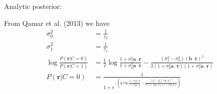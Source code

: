 \documentclass[12pt]{article}
\begin{document}
Analytic posterior:

From Qamar et al. (2013) we have
\begin{equation}
\begin{aligned}
\sigma_0^2 &= \frac{1}{\tau_0}\\
\sigma_1^2 &= \frac{1}{\tau_1}\\
\log \frac{P(\mathbf{r}|C = 0)}{P(\mathbf{r}|C = 1)} &= \frac{1}{2} \log \frac{1 + \sigma_1^2 \mathbf{a} \cdot \mathbf{r}}{1 + \sigma_0^2\mathbf{a} \cdot \mathbf{r}} - \frac{(\sigma_1^2 - \sigma_0^2)(\mathbf{b} \cdot \mathbf{r})^2}{2 (1 + \sigma_0^2 \mathbf{a} \cdot \mathbf{r})(1 + \sigma_1^2 \mathbf{a} \cdot \mathbf{r})}\\
P(\mathbf{r}|C = 0) &= \frac{1}{1 + e^{-(\frac{1}{2} \log \frac{1 + \sigma_1^2 \mathbf{a} \cdot \mathbf{r}}{1 + \sigma_0^2\mathbf{a} \cdot \mathbf{r}} - \frac{(\sigma_1^2 - \sigma_0^2)(\mathbf{b} \cdot \mathbf{r})^2}{2 (1 + \sigma_0^2 \mathbf{a} \cdot \mathbf{r})(1 + \sigma_1^2 \mathbf{a} \cdot \mathbf{r})})}}
\end{aligned}
\end{equation}
\end{document}
